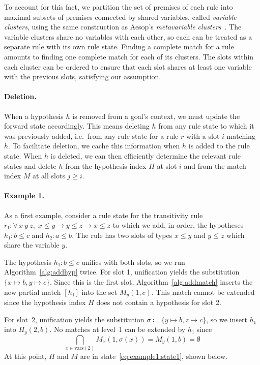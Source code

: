 \documentclass[runningheads,leqno]{llncs}
\newcommand{\All}[2]{\ensuremath{\forall\, #1,\; #2}}
\newcommand{\vars}{\ensuremath{\mathrm{vars}}}
\begin{document}
To account for this fact, we partition the set of premises of each rule into maximal subsets of premises connected by shared variables, called \emph{variable clusters}, using the same construction as Aesop's \emph{metavariable clusters}~\cite{Aesop}.
The variable clusters share no variables with each other, so each can be treated as a separate rule with its own rule state.
Finding a complete match for a rule amounts to finding one complete match for each of its clusters.
The slots within each cluster can be ordered to ensure that each slot shares at least one variable with the previous slots, satisfying our assumption.

\paragraph{Deletion.}
When a hypothesis $h$ is removed from a goal's context, we must update the forward state accordingly.
This means deleting $h$ from any rule state to which it was previously added, i.e.\ from any rule state for a rule $r$ with a slot $i$ matching $h$.
To facilitate deletion, we cache this information when $h$ is added to the rule state.
When $h$ is deleted, we can then efficiently determine the relevant rule states and delete $h$ from the hypothesis index $H$ at slot $i$ and from the match index $M$ at all slots $j ≥ i$.

\paragraph{Example 1.}
As a first example, consider a rule state for the transitivity rule $r₁ : \All{x~y~z}{x ≤ y → y ≤ z → x ≤ z}$ to which we add, in order, the hypotheses
$h₁ : b ≤ c$ and $h₂ : a ≤ b$.
The rule has two slots of types $x ≤ y$ and $y ≤ z$ which share the variable $y$.

The hypothesis $h₁ : b ≤ c$ unifies with both slots, so we run Algorithm~\ref{alg:addhyp} twice.
For slot 1, unification yields the substitution $\{x ↦ b, y ↦ c\}$.
Since this is the first slot, Algorithm~\ref{alg:addmatch} inserts the new partial match $[h₁]$ into the set $M_{y}(1, c)$.
This match cannot be extended since the hypothesis index $H$ does not contain a hypothesis for slot 2.

For slot~2, unification yields the substitution $σ ≔ \{y ↦ b, z ↦ c\}$, so we insert $h₁$ into $H_{y}(2, b)$.
No matches at level~1 can be extended by $h₁$ since
\[
  \bigcap_{x \in \vars(2)} M_{x}(1, σ(x)) = M_{y}(1, b) = \emptyset
\]
At this point, $H$ and $M$ are in state~\eqref{eq:example1:state1}, shown below.
\end{document}
